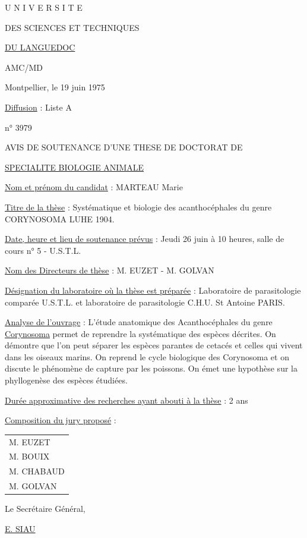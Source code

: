 U N I V E R S I T E\par
DES SCIENCES ET TECHNIQUES\par
\uline{DU LANGUEDOC}\par
AMC/MD

Montpellier, le 19 juin 1975

\uline{Diffusion} : Liste A\par
n° 3979

AVIS DE SOUTENANCE D'UNE THESE DE DOCTORAT DE\par
\uline{SPECIALITE BIOLOGIE ANIMALE}

\uline{Nom et prénom du candidat} : MARTEAU Marie

\uline{Titre de la thèse} : Systématique et biologie des acanthocéphales du genre
CORYNOSOMA LUHE 1904.

\uline{Date, heure et lieu de soutenance prévus} : Jeudi 26 juin à 10 heures, salle de
cours n° 5 - U.S.T.L.

\uline{Nom des Directeurs de thèse} : M. EUZET - M. GOLVAN

\uline{Désignation du laboratoire où la thèse est préparée} : Laboratoire de parasitologie
comparée U.S.T.L. et laboratoire de parasitologie C.H.U. St Antoine PARIS.

\uline{Analyse de l'ouvrage} : L'étude anatomique des Acanthocéphales du genre \uline{Corynosoma}
permet de reprendre la systématique des espèces décrites. On démontre que l'on
peut séparer les espèces parantes de cetacés et celles qui vivent dans les
oiseaux marins. On reprend le cycle biologique des Corynosoma et on discute
le phénomène de capture par les poissons. On émet une hypothèse sur la phyllogenèse
des espèces étudiées.

\uline{Durée approximative des recherches ayant abouti à la thèse} : 2 ans

\uline{Composition du jury proposé} :\quad\begin{tabular}[t]{l}M. EUZET\\M. BOUIX\\M. CHABAUD\\M. GOLVAN\end{tabular}

Le Secrétaire Général,

\uline{E. SIAU}

